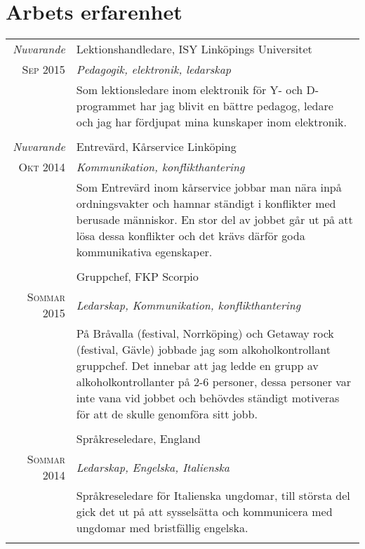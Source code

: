 \documentclass[a4paper,10pt]{article}
\begin{document}
\section{Arbets erfarenhet}
\begin{tabular}{r|p{11cm}}

    \emph{Nuvarande} &  Lektionshandledare, \textsc{ISY} Linköpings Universitet\\
    \textsc{Sep 2015} & \emph{Pedagogik, elektronik, ledarskap}\\
    &\footnotesize{Som lektionsledare inom elektronik för Y- och D-programmet har jag blivit en bättre pedagog, ledare och jag har fördjupat mina kunskaper inom elektronik. }\\\multicolumn{2}{c}{} \\

    \emph{Nuvarande} & Entrevärd, Kårservice Linköping \\         \textsc{Okt 2014} & \emph{Kommunikation, konflikthantering}\\
    & \footnotesize{Som Entrevärd inom kårservice jobbar man nära inpå ordningsvakter och hamnar ständigt i konflikter med berusade människor. En stor del av jobbet går ut på att lösa dessa konflikter och det krävs därför goda kommunikativa egenskaper.}\\\multicolumn{2}{c}{} \\

    & Gruppchef, \textsc{FKP} Scorpio \\         
    \textsc{Sommar 2015} & \emph{Ledarskap, Kommunikation, konflikthantering}\\
    & \footnotesize{På Bråvalla (festival, Norrköping) och Getaway rock (festival, Gävle) jobbade jag som alkoholkontrollant gruppchef. Det innebar att jag ledde en grupp av alkoholkontrollanter på 2-6 personer, dessa personer var inte vana vid jobbet och behövdes ständigt motiveras för att de skulle genomföra sitt jobb.}\\\multicolumn{2}{c}{} \\
    
    & Språkreseledare, England \\         
    \textsc{Sommar 2014} & \emph{Ledarskap, Engelska, Italienska }\\
    & \footnotesize{Språkreseledare för Italienska ungdomar, till största del gick det ut på att sysselsätta och kommunicera med ungdomar med bristfällig engelska.}\\\multicolumn{2}{c}{} \\
    

\end{tabular}
\end{document}
